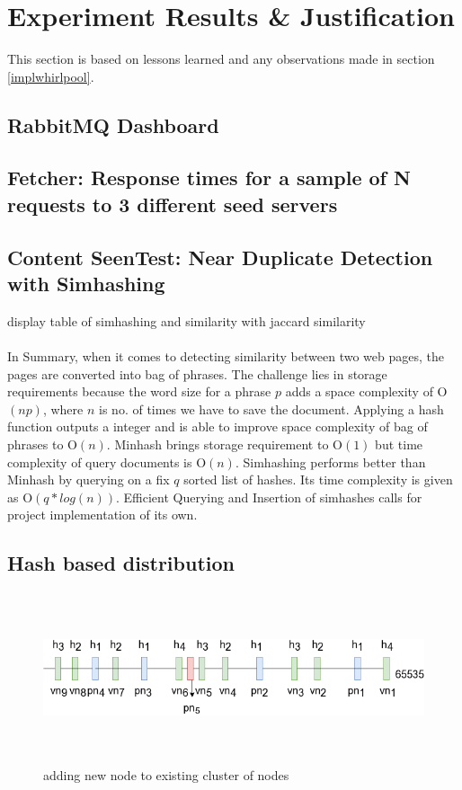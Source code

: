 \chapter{Experiment Results \& Justification}
This section is based on lessons learned and any observations made in section \ref{implwhirlpool}.

\section{RabbitMQ Dashboard}

\pagebreak

\section{Fetcher: Response times for a sample of N requests to 3 different seed servers}

\pagebreak

\section{Content SeenTest: Near Duplicate Detection with Simhashing}\label{handle_dedupe}
display table of simhashing and similarity with jaccard similarity
\\
\\
In Summary, when it comes to detecting similarity between two web pages, the pages are converted into
bag of phrases. The challenge lies in storage requirements because the word size for a phrase $p$ adds
a space complexity of O$(np)$, where $n$ is no. of times we have to save the document. Applying a hash
function outputs a integer and is able to improve space complexity of bag of phrases to O$(n)$.
Minhash\cite{dedupe} brings storage requirement to O$(1)$ but time complexity of query documents is
O$(n)$. Simhashing\cite{dedupe} performs better than Minhash by querying on a fix $q$ sorted list of
hashes. Its time complexity is given as O$(q * log(n))$. Efficient Querying and Insertion of simhashes
calls for project implementation of its own.

\pagebreak

\section{Hash based distribution}
\begin{figure}[h!]
  \centering
  \includegraphics[width=12cm,height=5cm,keepaspectratio]{../media/crawler/addingnode.png}
  \caption{adding new node to existing cluster of nodes}
  \label{fig:addingnode}
\end{figure}

